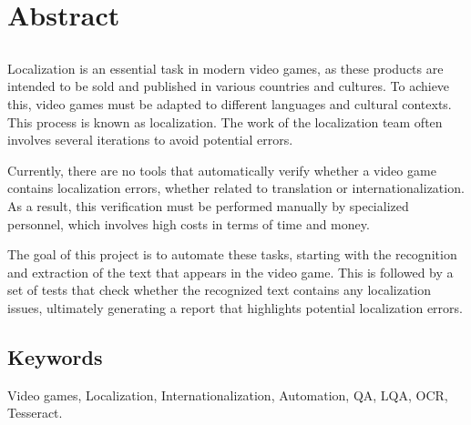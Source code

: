 \chapter*{Abstract}

\section*{\tituloPortadaEngVal}

Localization is an essential task in modern video games, as these products are intended to be sold and published in various countries and cultures. To achieve this, video games must be adapted to different languages and cultural contexts. This process is known as localization. The work of the localization team often involves several iterations to avoid potential errors.

Currently, there are no tools that automatically verify whether a video game contains localization errors, whether related to translation or internationalization. As a result, this verification must be performed manually by specialized personnel, which involves high costs in terms of time and money.

The goal of this project is to automate these tasks, starting with the recognition and extraction of the text that appears in the video game. This is followed by a set of tests that check whether the recognized text contains any localization issues, ultimately generating a report that highlights potential localization errors.

\section*{Keywords}

\noindent Video games, Localization, Internationalization, Automation, QA, LQA, OCR, Tesseract.




